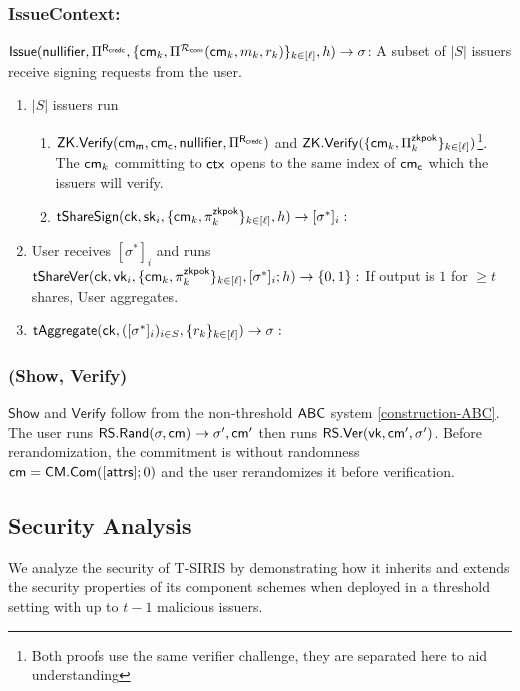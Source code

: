 \subsubsection{IssueContext:}
$\mathsf{Issue}(\mathsf{nullifier}, \Pi^{\mathsf{R}_{\mathsf{credc}}}, \{\mathsf{cm}_k, \Pi^{\mathcal{R}_{\mathsf{com}}}(\mathsf{cm}_k, m_k, r_k)\}_{k \in [\ell]}, h) \to \sigma$: A subset of $|S|$ issuers receive signing requests from the user. 
\begin{enumerate}
    \item $|S|$ issuers run 
    \begin{enumerate}
        \item $\mathsf{ZK.Verify}(\mathsf{cm_m}, \mathsf{cm_c}, \mathsf{nullifier}, \Pi^{\mathsf{R}_{\mathsf{credc}}})$ and $\mathsf{ZK.Verify}(\{\mathsf{cm}_k, \Pi_k^{\mathsf{zkpok}}\}_{k \in [\ell]})$\footnote{Both proofs use the same verifier challenge, they are separated here to aid understanding}. The $\mathsf{cm}_k$ committing to $\mathsf{ctx}$ opens to the same index of $\mathsf{cm_c}$ which the issuers will verify.
        \item $\mathsf{tShareSign}(\mathsf{ck}, \mathsf{sk}_i, \{\mathsf{cm}_k, \pi_k^{\mathsf{zkpok}}\}_{k \in [\ell]}, h) \to [\sigma^*]_i:$
    \end{enumerate}
    \item User receives $[\sigma^*]_i$ and runs $\mathsf{tShareVer}(\mathsf{ck}, \mathsf{vk}_i, \{\mathsf{cm}_k, \pi_k^{\mathsf{zkpok}}\}_{k \in [\ell]}, [\sigma^*]_i; h) \to \{0,1\}:$ If output is $1$ for $\geq t$ shares, User aggregates.
    \item $\mathsf{tAggregate}(\mathsf{ck}, ([\sigma^*]_i)_{i \in S}, \{r_k\}_{k \in [\ell]}) \to \sigma:$
\end{enumerate}

\subsubsection*{(Show, Verify)}
$\mathsf{Show}$ and $\mathsf{Verify}$ follow from the non-threshold $\mathsf{ABC}$ system \ref{construction-ABC}. The user runs $\mathsf{RS.Rand}(\sigma, \mathsf{cm}) \to \sigma', \mathsf{cm}'$ then runs $\mathsf{RS.Ver}(\mathsf{vk}, \mathsf{cm}', \sigma')$. Before rerandomization, the commitment is without randomness $\mathsf{cm} = \mathsf{CM.Com}([\mathsf{attrs}]; 0)$ and the user rerandomizes it before verification.


\subsection{Security Analysis}
\label{sec:threshold-security}

We analyze the security of T-SIRIS by demonstrating how it inherits and extends the security properties of its component schemes when deployed in a threshold setting with up to $t-1$ malicious issuers.

